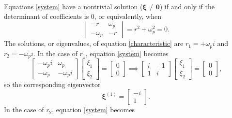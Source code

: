 \documentclass{article}
\begin{document}
Equations \ref{system} have a nontrivial solution ($\pmb{\xi} \neq \mathbf{0}$) if and only if the determinant of coefficients is $0$, or equivalently, when
\begin{equation}\label{characteristic}
    \begin{vmatrix}
        -r & \omega_p \\
        -\omega_p & -r
    \end{vmatrix} =
    r^2 + \omega_p^2 = 0\text{.}
\end{equation}
The solutions, or eigenvalues, of equation \ref{characteristic} are $r_1 = +\omega_p i$ and $r_2 = -\omega_p i$. In the case of $r_1$, equation \ref{system} becomes
\begin{equation}
    \begin{bmatrix}
        -\omega_p i & \omega_p \\
        -\omega_p & -\omega_p i
    \end{bmatrix}
    \begin{bmatrix}
        \xi_1 \\ \xi_2
    \end{bmatrix} =
    \begin{bmatrix}
        0 \\ 0
    \end{bmatrix} \implies
    \begin{bmatrix}
        i & -1 \\
        1 & i
    \end{bmatrix}
    \begin{bmatrix}
        \xi_1 \\ \xi_2
    \end{bmatrix} =
    \begin{bmatrix}
        0 \\ 0
    \end{bmatrix}\text{,}
\end{equation}
so the corresponding eigenvector
\begin{equation}
    \pmb{\xi}^{(1)} = 
    \begin{bmatrix}
        -i \\ 1
    \end{bmatrix}\text{.}
\end{equation}
In the case of $r_2$, equation \ref{system} becomes
\end{document}
